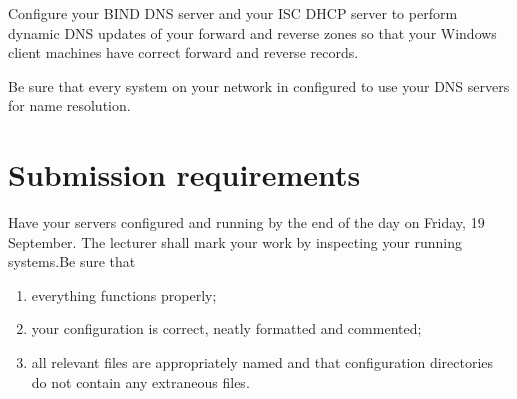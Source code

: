 \documentclass{article}
\begin{document}
Configure your BIND DNS server and your ISC DHCP server to perform dynamic DNS updates of your forward and reverse zones so that your Windows client machines have correct forward and reverse records.

Be sure that every system on your network in configured to use your DNS servers for name resolution.

\section{Submission requirements}
Have your servers configured and running by the end of the day on Friday, 19 September.  The lecturer shall mark your work by inspecting your running systems.Be sure that 
  \begin{enumerate}
    \item everything functions properly;
    \item your configuration is correct, neatly formatted and commented;
    \item all relevant files are appropriately named and that configuration 
          directories do not contain any extraneous files.
  \end{enumerate}
\end{document}
